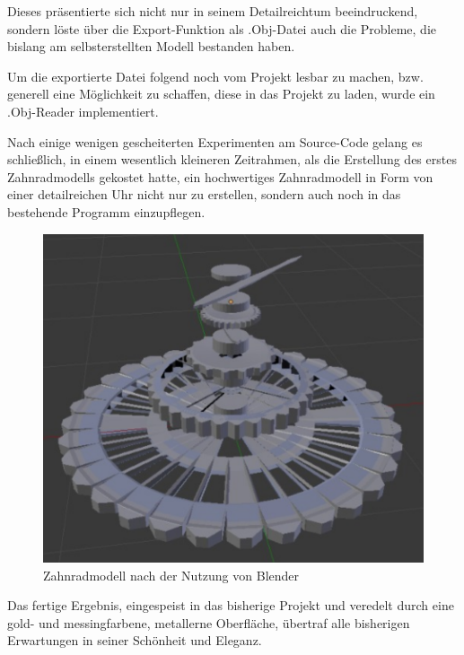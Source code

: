 \documentclass{article}
\begin{document}
Dieses präsentierte sich nicht nur in seinem Detailreichtum beeindruckend, sondern löste über die Export-Funktion als .Obj-Datei auch die Probleme, die bislang am selbsterstellten Modell bestanden haben. 

Um die exportierte Datei folgend noch vom Projekt lesbar zu machen, bzw. generell eine Möglichkeit zu schaffen, diese in das Projekt zu laden, wurde ein .Obj-Reader implementiert. 

Nach einige wenigen gescheiterten Experimenten am Source-Code gelang es schließlich, in einem wesentlich kleineren Zeitrahmen, als die Erstellung des erstes Zahnradmodells gekostet hatte, ein hochwertiges Zahnradmodell in Form von einer detailreichen Uhr nicht nur zu erstellen, sondern auch noch in das bestehende Programm einzupflegen. 


\begin{figure}[h!]
\centering
\includegraphics[scale=0.7]{res/Final_Clock_Blender.png}
\caption{Zahnradmodell nach der Nutzung von Blender}
\label{fig:clock_blender}
\end{figure}

Das fertige Ergebnis, eingespeist in das bisherige Projekt und veredelt durch eine gold- und messingfarbene, metallerne Oberfläche, übertraf alle bisherigen Erwartungen in seiner Schönheit und Eleganz. 
\end{document}
